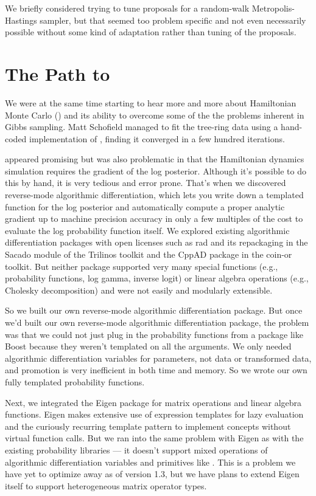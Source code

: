 We briefly considered trying to tune proposals for a random-walk
Metropolis-Hastings sampler, but that seemed too problem specific and
not even necessarily possible without some kind of adaptation rather
than tuning of the proposals. 
 

\section*{The Path to \Stan}

We were at the same time starting to hear more and more about
Hamiltonian Monte Carlo (\HMC) and its ability to overcome some of the
the problems inherent in Gibbs sampling.  Matt Schofield managed to
fit the tree-ring data using a hand-coded implementation of \HMC,
finding it converged in a few hundred iterations.

\HMC appeared promising but was also problematic in that the
Hamiltonian dynamics simulation requires the gradient of the log
posterior.  Although it's possible to do this by hand, it is very
tedious and error prone.  That's when we discovered reverse-mode
algorithmic differentiation, which lets you write down a templated
\Cpp function for the log posterior and automatically compute a proper
analytic gradient up to machine precision accuracy in only a few
multiples of the cost to evaluate the log probability function itself.
We explored existing algorithmic differentiation packages with open
licenses such as {\sc rad} \citep{Gay:2005} and its repackaging in the
Sacado module of the Trilinos toolkit and the {\small CppAD} package in the
{\sc coin-or} toolkit.  But neither package supported very many
special functions (e.g., probability functions, log gamma, inverse logit) or
linear algebra operations (e.g., Cholesky decomposition) and were not
easily and modularly extensible.  

So we built our own reverse-mode algorithmic differentiation package.
But once we'd built our own reverse-mode algorithmic differentiation
package, the problem was that we could not just plug in the
probability functions from a package like Boost because they weren't
templated on all the arguments.  We only needed algorithmic
differentiation variables for parameters, not data or transformed
data, and promotion is very inefficient in both time and memory.  So
we wrote our own fully templated probability functions.  

Next, we integrated the Eigen \Cpp package for matrix operations and
linear algebra functions.  Eigen makes extensive use of expression
templates for lazy evaluation and the curiously recurring template
pattern to implement concepts without virtual function calls.  But we
ran into the same problem with Eigen as with the existing probability
libraries --- it doesn't support mixed operations of algorithmic
differentiation variables and primitives like .  This is
a problem we have yet to optimize away as of \Stan version 1.3, but we
have plans to extend Eigen itself to support heterogeneous 
matrix operator types.

